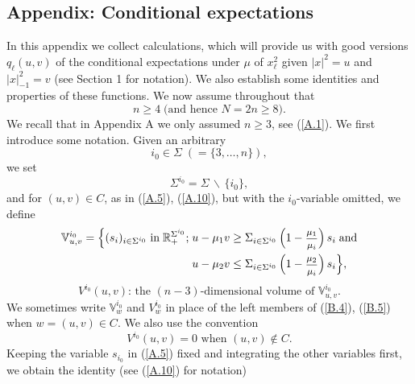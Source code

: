\documentclass[12pt,leqno]{article}
\def\IR{{\mathbb R}}
\def\IV{{\mathbb V}}
\def\dis{\displaystyle}
\def\f{\footnotesize}
\begin{document}
\begin{appendix}
\section{Appendix: Conditional expectations}
\setcounter{equation}{0}

In this appendix we collect calculations, which will provide us with good versions $q_\ell (u,v)$ of the conditional expectations under $\mu$ of $x^2_\ell$  given $|x|^2 = u$ and $|x|^2_{-1} = v$ (see Section 1 for notation). We also establish some identities and properties of these functions. We now assume throughout that
\begin{equation}\label{B.1}
n \ge 4 \; \mbox{(and hence $N = 2n \ge 8$)}.
\end{equation}
We recall that in Appendix A we only assumed $n \ge 3$, see (\ref{A.1}). We first introduce some notation. Given an arbitrary
\begin{equation}\label{B.2}
i_0 \in \Sigma \; (= \{3, \dots,n\}),
\end{equation}
we set
\begin{equation}\label{B.3}
\Sigma^{i_0} = \Sigma \, \backslash \, \{i_0\},
\end{equation}
and for $(u,v) \in C$, as in (\ref{A.5}), (\ref{A.10}), but with the $i_0$-variable omitted, we define
\begin{equation}\label{B.4}
\begin{split}
\IV^{i_0}_{u,v} = \Big\{(s_i)_{i \in \Sigma^{i_0}} \;\mbox{in} \; \IR_+^{\Sigma^{i_0}}; & \; u - \mu_1 v \ge \Sigma_{i \in \Sigma^{i_0}} \,\Big(1 - \mbox{\f $\dis\frac{\mu_1}{\mu_i}$}\Big) \, s_i \; \mbox{and}
\\
&\; u - \mu_2 v \le \Sigma_{i \in \Sigma^{i_0}} \, \Big(1 - \mbox{\f $\dis\frac{\mu_2}{\mu_i}$}\Big) \, s_i \Big\},
\end{split}
\end{equation}
\begin{equation}\label{B.5}
\mbox{$V^{i_0} (u,v)$: the $(n-3)$-dimensional volume of $\IV_{u,v}^{i_0}$}.
\end{equation}
We sometimes write $\IV^{i_0}_w$ and $V^{i_0}_w$ in place of the left members of (\ref{B.4}), (\ref{B.5}) when $w = (u,v) \in C$. We also use the convention
\begin{equation}\label{B.6}
\mbox{$V^{i_0} (u,v) = 0$ when $(u,v) \notin C$}.
\end{equation}
Keeping the variable $s_{i_0}$ in (\ref{A.5}) fixed and integrating the other variables first, we obtain the identity (see (\ref{A.10}) for notation)

\end{appendix}
\end{document}
